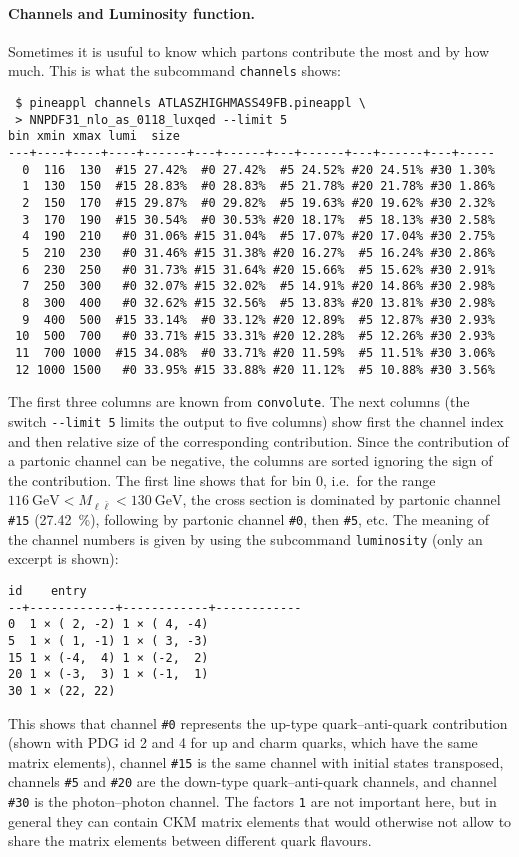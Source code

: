 \paragraph{Channels and Luminosity function.}
Sometimes it is usuful to know which partons contribute the most and by how much.
This is what the subcommand \texttt{channels} shows:
\begin{verbatim}
 $ pineappl channels ATLASZHIGHMASS49FB.pineappl \
 > NNPDF31_nlo_as_0118_luxqed --limit 5
bin xmin xmax lumi  size
---+----+----+----+------+---+------+---+------+---+------+---+-----
  0  116  130  #15 27.42%  #0 27.42%  #5 24.52% #20 24.51% #30 1.30%
  1  130  150  #15 28.83%  #0 28.83%  #5 21.78% #20 21.78% #30 1.86%
  2  150  170  #15 29.87%  #0 29.82%  #5 19.63% #20 19.62% #30 2.32%
  3  170  190  #15 30.54%  #0 30.53% #20 18.17%  #5 18.13% #30 2.58%
  4  190  210   #0 31.06% #15 31.04%  #5 17.07% #20 17.04% #30 2.75%
  5  210  230   #0 31.46% #15 31.38% #20 16.27%  #5 16.24% #30 2.86%
  6  230  250   #0 31.73% #15 31.64% #20 15.66%  #5 15.62% #30 2.91%
  7  250  300   #0 32.07% #15 32.02%  #5 14.91% #20 14.86% #30 2.98%
  8  300  400   #0 32.62% #15 32.56%  #5 13.83% #20 13.81% #30 2.98%
  9  400  500  #15 33.14%  #0 33.12% #20 12.89%  #5 12.87% #30 2.93%
 10  500  700   #0 33.71% #15 33.31% #20 12.28%  #5 12.26% #30 2.93%
 11  700 1000  #15 34.08%  #0 33.71% #20 11.59%  #5 11.51% #30 3.06%
 12 1000 1500   #0 33.95% #15 33.88% #20 11.12%  #5 10.88% #30 3.56%
\end{verbatim}
The first three columns are known from \texttt{convolute}.
The next columns (the switch \texttt{-{}-limit 5} limits the output to five columns) show first the channel index and then relative size of the corresponding contribution.
Since the contribution of a partonic channel can be negative, the columns are sorted ignoring the sign of the contribution.
The first line shows that for bin 0, i.e.\ for the range $\SI{116}{\giga\electronvolt} < M_{\ell \bar{\ell}} < \SI{130}{\giga\electronvolt}$, the cross section is dominated by partonic channel \texttt{\#15} (\SI{27.42}{\percent}), following by partonic channel \texttt{\#0}, then \texttt{\#5}, etc.
The meaning of the channel numbers is given by using the subcommand \texttt{luminosity} (only an excerpt is shown):
\begin{verbatim}
id    entry
--+------------+------------+------------
0  1 × ( 2, -2) 1 × ( 4, -4)
5  1 × ( 1, -1) 1 × ( 3, -3)
15 1 × (-4,  4) 1 × (-2,  2)
20 1 × (-3,  3) 1 × (-1,  1)
30 1 × (22, 22)
\end{verbatim}
This shows that channel \texttt{\#0} represents the up-type quark--anti-quark contribution (shown with PDG id 2 and 4 for up and charm quarks, which have the same matrix elements), channel \texttt{\#15} is the same channel with initial states transposed, channels \texttt{\#5} and \texttt{\#20} are the down-type quark--anti-quark channels, and channel \texttt{\#30} is the photon--photon channel.
The factors \texttt{1} are not important here, but in general they can contain CKM matrix elements that would otherwise not allow to share the matrix elements between different quark flavours.

